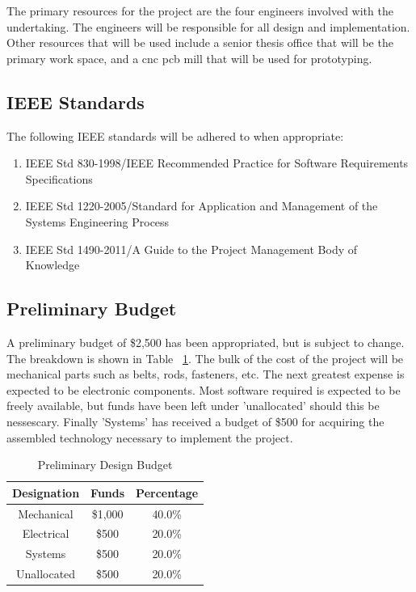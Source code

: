 The primary resources for the project are the four engineers involved with the undertaking.
The engineers will be responsible for all design and implementation.
Other resources that will be used include a senior thesis office that will be the primary work space, and a \gls{cnc} \gls{pcb} mill that will be used for prototyping.

\subsection{IEEE Standards}
The following IEEE standards will be adhered to when appropriate:
\begin{enumerate} \parskip2pt
	\item IEEE Std 830-1998/IEEE Recommended Practice for Software Requirements Specifications
	\item IEEE Std 1220-2005/Standard for Application and Management of the Systems Engineering Process
	\item IEEE Std 1490-2011/A Guide to the Project Management Body of Knowledge
\end{enumerate}

\subsection{Preliminary Budget}
A preliminary budget of \$2,500 has been appropriated, but is subject to change.
The breakdown is shown in Table ~\ref{table:budget}.
The bulk of the cost of the project will be mechanical parts such as belts, rods, fasteners, etc.
The next greatest expense is expected to be electronic components.
Most software required is expected to be freely available, but funds have been left under 'unallocated' should this be nessescary.
Finally 'Systems' has received a budget of \$500 for acquiring the assembled technology necessary to implement the project. 

\begin{table}[ht] 
	\centering 
	\begin{tabular}{c c c} 
		Designation	& Funds 		& Percentage\\
		\hline
		Mechanical	& \$1,000 	& 40.0\% \\ 
		Electrical	& \$500 		& 20.0\% \\ 
		Systems		& \$500 		& 20.0\% \\ 
		Unallocated	& \$500 		& 20.0\% \\
	\end{tabular} 
	\caption{Preliminary Design Budget}
	\label{table:budget}
\end{table}

